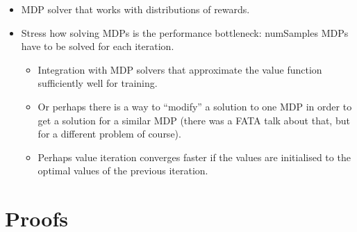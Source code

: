 \documentclass{mpaper}
\newtheorem{problem}[theorem]{Open Problem}
\begin{document}

\begin{itemize}
\item MDP solver that works with distributions of rewards.
\item Stress how solving MDPs is the performance bottleneck: numSamples MDPs
  have to be solved for each iteration.
  \begin{itemize}
  \item Integration with MDP solvers that approximate the value function
    sufficiently well for training.
  \item Or perhaps there is a way to ``modify'' a solution to one MDP in order
    to get a solution for a similar MDP (there was a FATA talk about that, but
    for a different problem of course).
  \item Perhaps value iteration converges faster if the values are initialised
    to the optimal values of the previous iteration.
  \end{itemize}
\end{itemize}




\appendix
\section{Proofs} \label{appendix:proofs}
\end{document}
